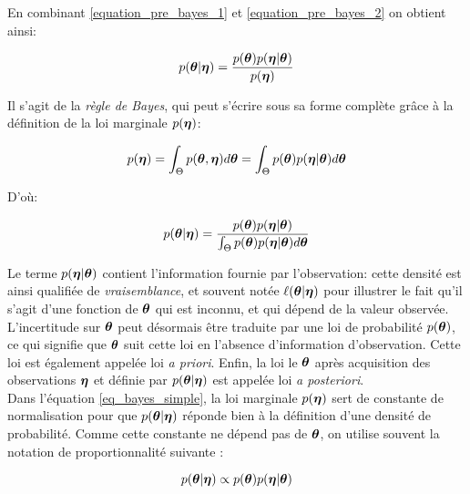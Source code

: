 	En combinant \eqref{equation_pre_bayes_1} et \eqref{equation_pre_bayes_2} on obtient ainsi:
	
	\begin{equation}
		p({\bm{\theta}} | {\bm{\eta}}) = \dfrac{p({\bm{\theta}})p({\bm{\eta}} | {\bm{\theta}})}{p({\bm{\eta}})}
		\label{eq_bayes_simple}
	\end{equation}
	
	Il s'agit de la \textit{règle de Bayes}, qui peut s'écrire sous sa forme complète grâce à la définition de la loi marginale $p({\bm{\eta}})$:
	
	\begin{equation}
		p({\bm{\eta}}) = \int_{\Theta} p({\bm{\theta}},{\bm{\eta}})d{\bm{\theta}} = \int_{\Theta} p({\bm{\theta}})p({\bm{\eta}}|{\bm{\theta}})d{\bm{\theta}}
		\label{eq_definition_marginale_d}
	\end{equation}
	
	D'où:

	\begin{equation}
	p({\bm{\theta}} | {\bm{\eta}}) = \dfrac{p({\bm{\theta}})p({\bm{\eta}} | {\bm{\theta}})}{ \int_{\Theta} p({\bm{\theta}})p({\bm{\eta}}|{\bm{\theta}})d{\bm{\theta}}}
	\label{eq_bayes_simple}
	\end{equation}
	
	Le terme $p({\bm{\eta}}|{\bm{\theta}})$ contient l'information fournie par l'observation: cette densité est ainsi qualifiée de \textit{vraisemblance}, et souvent notée $\ell({\bm{\theta}} |{\bm{\eta}})$ pour illustrer le fait qu'il s'agit d'une fonction de ${\bm{\theta}}$ qui est inconnu, et qui dépend de la valeur observée. 
	L'incertitude sur ${\bm{\theta}}$ peut désormais être traduite par une loi de probabilité $p({\bm{\theta}})$, ce qui signifie que ${\bm{\theta}}$ suit cette loi en l'absence d'information d'observation. Cette loi est également appelée loi  \textit{a priori}. 
	Enfin, la loi le ${\bm{\theta}}$ après acquisition des observations ${\bm{\eta}}$ et définie par  	$p({\bm{\theta}} | {\bm{\eta}})$ est appelée loi \textit{a posteriori}.\\
	
	Dans l'équation \eqref{eq_bayes_simple}, la loi marginale $p({\bm{\eta}})$ sert de constante de normalisation pour que $p({\bm{\theta}} | {\bm{\eta}})$ réponde bien à la définition d'une densité de probabilité. Comme cette constante ne dépend pas de ${\bm{\theta}}$, on utilise souvent la notation de proportionnalité suivante : 
	
	\begin{equation}
	p({\bm{\theta}} | {\bm{\eta}}) \propto p({\bm{\theta}})p({\bm{\eta}} | {\bm{\theta}})
	\label{eq_bayes_proportionnalite}
	\end{equation}
	

